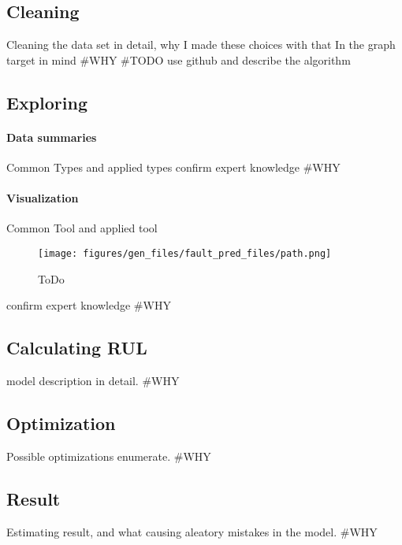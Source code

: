 	\subsection{Cleaning}
Cleaning the data set in detail, why I made these choices with that In the graph target in mind
\#WHY
		\#TODO use github and describe the algorithm
	\subsection{Exploring}
		\paragraph{Data summaries}
		Common Types and applied types
		confirm expert knowledge
		\#WHY
		\paragraph{Visualization}
		Common Tool and applied tool
			\begin{figure}[H]
			\centering
			\texttt{[image: figures/gen\_files/fault\_pred\_files/path.png]}
			\caption{ToDo} 
			\end{figure}
		confirm expert knowledge
\#WHY
	\subsection{Calculating RUL}
model description in detail.
\#WHY
	\subsection{Optimization}
Possible optimizations enumerate.
\#WHY
	\subsection{Result}
Estimating result, and what causing aleatory mistakes in the model. 
\#WHY
\cite{GitHub_FP_RUL}